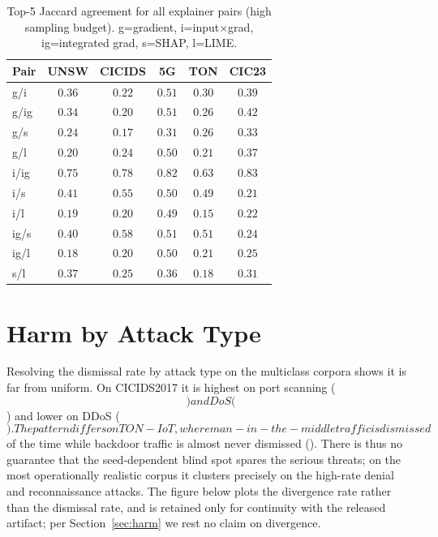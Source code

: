 \documentclass[conference]{IEEEtran}
\begin{document}
\begin{table}[h]
\centering
\caption{Top-5 Jaccard agreement for all explainer pairs (high sampling budget). g=gradient,
i=input$\times$grad, ig=integrated grad, s=SHAP, l=LIME.}
\label{tab:pairwise}
\small\setlength{\tabcolsep}{3.5pt}
\begin{tabular}{lccccc}
\toprule
Pair & UNSW & CICIDS & 5G & TON & CIC23 \\
\midrule
g/i   & $0.36$ & $0.22$ & $0.51$ & $0.30$ & $0.39$ \\
g/ig  & $0.34$ & $0.20$ & $0.51$ & $0.26$ & $0.42$ \\
g/s   & $0.24$ & $0.17$ & $0.31$ & $0.26$ & $0.33$ \\
g/l   & $0.20$ & $0.24$ & $0.50$ & $0.21$ & $0.37$ \\
i/ig  & $0.75$ & $0.78$ & $0.82$ & $0.63$ & $0.83$ \\
i/s   & $0.41$ & $0.55$ & $0.50$ & $0.49$ & $0.21$ \\
i/l   & $0.19$ & $0.20$ & $0.49$ & $0.15$ & $0.22$ \\
ig/s  & $0.40$ & $0.58$ & $0.51$ & $0.51$ & $0.24$ \\
ig/l  & $0.18$ & $0.20$ & $0.50$ & $0.21$ & $0.25$ \\
s/l   & $0.37$ & $0.25$ & $0.36$ & $0.18$ & $0.31$ \\
\bottomrule
\end{tabular}
\end{table}



\section{Harm by Attack Type}\label{app:bytype}
Resolving the dismissal rate by attack type on the multiclass corpora shows it is far from uniform.
On CICIDS2017 it is highest on port scanning ($$) and DoS
($$) and lower on DDoS ($$). The
pattern differs on TON-IoT, where man-in-the-middle traffic is dismissed
$$ of the time while backdoor traffic is almost never dismissed
($$). There is thus no guarantee that the seed-dependent blind spot
spares the serious threats; on the most operationally realistic corpus it clusters precisely on the
high-rate denial and reconnaissance attacks. The figure below plots the divergence rate rather than
the dismissal rate, and is retained only for continuity with the released artifact; per
Section~\ref{sec:harm} we rest no claim on divergence.
\end{document}
